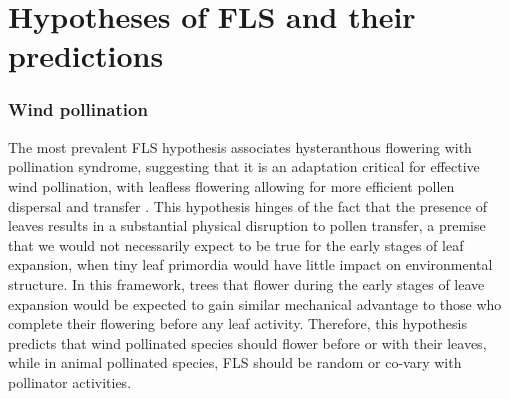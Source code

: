 \documentclass[12pt]{article}\usepackage[]{graphicx}\usepackage[]{color}
\begin{document}
\section*{Hypotheses of FLS and their predictions}
\subsubsection*{ Wind pollination}
\indent\indent The most prevalent FLS hypothesis associates hysteranthous flowering with pollination syndrome, suggesting that it is an adaptation critical for effective wind pollination, with leafless flowering allowing for more efficient pollen dispersal and transfer \citep{Whitehead1969, Spurr1980,Friedman2009}. %
 This hypothesis hinges of the fact that the presence of leaves results in a substantial physical disruption to pollen transfer, a premise that we would not necessarily expect to be true for the early stages of leaf expansion, when tiny leaf primordia would have little impact on environmental structure. %
In this framework, trees that flower during the early stages of leave expansion would be expected to gain similar mechanical advantage to those who complete their flowering before any leaf activity. Therefore, this hypothesis predicts that wind pollinated species should flower before or with their leaves, while in animal pollinated species, FLS should be random or co-vary with pollinator activities.
\end{document}
